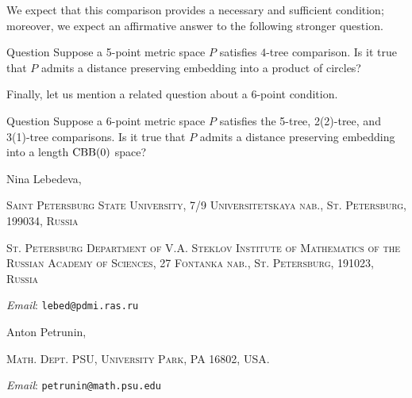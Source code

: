 \documentclass{article}
\makeatletter
\newcommand{\Addresses}{{\bigskip\footnotesize

\noindent Nina Lebedeva,
\par\nopagebreak
 \textsc{Saint Petersburg State University, 7/9 Universitetskaya nab., St. Petersburg, 199034, Russia}
\par
\nopagebreak
 \textsc{St. Petersburg Department of V.A. Steklov Institute of Mathematics of the Russian Academy of Sciences, 27 Fontanka nab., St. Petersburg, 191023, Russia}
  \par\nopagebreak
  \textit{Email}: \texttt{lebed@pdmi.ras.ru}

\medskip

\noindent   Anton Petrunin, 
\par\nopagebreak
 \textsc{Math. Dept. PSU, University Park, PA 16802, USA.}
  \par\nopagebreak
  \textit{Email}: \texttt{petrunin@math.psu.edu}
  
}}
\makeatother
\begin{document}
We expect that this comparison provides a necessary and sufficient condition; moreover, we expect an affirmative answer to the following stronger question.


\begin{thm}{Question}
Suppose a 5-point metric space $P$ satisfies $4$-tree comparison.
Is it true that $P$ admits a distance preserving embedding into a product of circles?
\end{thm}

Finally, let us mention a related question about a 6-point condition. 

\begin{thm}{Question}
Suppose a 6-point metric space $P$ satisfies the 5-tree, 2(2)-tree, and 3(1)-tree comparisons.
Is it true that $P$ admits a distance preserving embedding into a length $\mathrm{CBB}(0)$ space?
\end{thm}

{\sloppy
\printbibliography[heading=bibintoc]
\fussy
}

\Addresses
\end{document}
